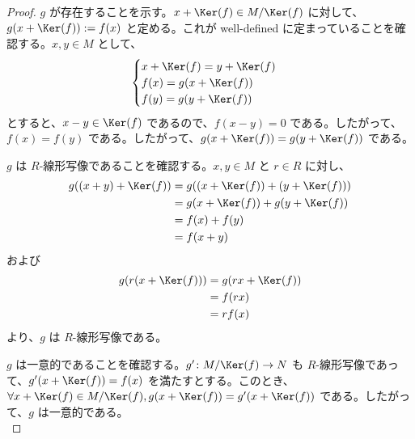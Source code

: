 \documentclass[article,paper=a4paper]{jlreq}
\begin{document}
\begin{proof}
  $g$ が存在することを示す。$x + \Ker(f) \in M/\Ker(f)$ に対して、$g(x + \Ker(f)) := f(x)$ と定める。これが well-defined に定まっていることを確認する。$x, y \in M$ として、
  \begin{align*}
    \begin{cases}
      x + \Ker(f) = y + \Ker(f) \\
      f(x) = g(x + \Ker(f)) \\
      f(y) = g(y + \Ker(f))
    \end{cases}
  \end{align*}
  とすると、$x - y \in \Ker(f)$ であるので、$f(x - y) = 0$ である。したがって、$f(x) = f(y)$ である。したがって、$g(x + \Ker(f)) = g(y + \Ker(f))$ である。\\

  \vspace{1\baselineskip}

  \quad $g$ は $R$-\hspace{0pt}線形写像であることを確認する。$x, y \in M$ と $r \in R$ に対し、
  \begin{align*}
    g((x+y) + \Ker(f)) &= g((x+\Ker(f)) + (y+\Ker(f)))\\
    &= g(x+\Ker(f)) + g(y+\Ker(f))\\
    &= f(x) + f(y)\\
    &= f(x+y)
  \end{align*}
  および
  \begin{align*}
    g(r(x+\Ker(f))) &= g(rx + \Ker(f))\\
    &= f(rx)\\
    &= rf(x)
  \end{align*}
  より、$g$ は $R$-\hspace{0pt}線形写像である。\\

  \vspace{1\baselineskip}

  $g$ は一意的であることを確認する。$g' \colon M/\Ker(f) \to N$ も $R$-\hspace{0pt}線形写像であって、$g'(x + \Ker(f)) = f(x)$ を満たすとする。このとき、$\forall x + \Ker(f) \in M/\Ker(f), g(x + \Ker(f)) = g'(x + \Ker(f))$ である。したがって、$g$ は一意的である。\\

  \vspace{1\baselineskip}


\end{proof}
\end{document}

